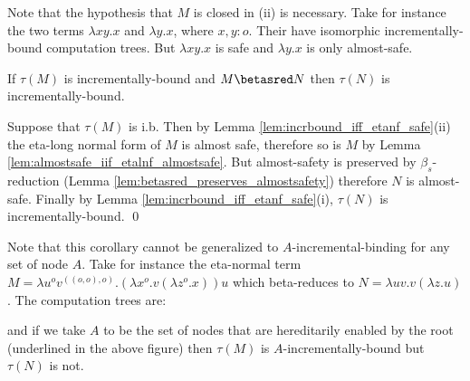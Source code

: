 Note that the hypothesis that $M$ is closed in (ii) is necessary.
Take for instance the two terms $\lambda x y .x$ and $\lambda y . x$,
where $x,y:o$. Their have isomorphic incrementally-bound computation
trees. But $\lambda x y .x$ is safe and $\lambda y . x$ is
only almost-safe.


\begin{corollary}
\label{cor:betasred_preserve_incrbound} If $\tau(M)$ is incrementally-bound and $M \betasred N$ then $\tau(N)$ is incrementally-bound.
\end{corollary}
\proof Suppose that $\tau(M)$ is i.b. Then by Lemma
\ref{lem:incrbound_iff_etanf_safe}(ii) the eta-long normal form of $M$ is almost safe, therefore so is $M$ by Lemma \ref{lem:almostsafe_iif_etalnf_almostsafe}.
But almost-safety is preserved by $\beta_s$-reduction (Lemma \ref{lem:betasred_preserves_almostsafety}) therefore $N$ is almost-safe. Finally by Lemma \ref{lem:incrbound_iff_etanf_safe}(i), $\tau(N)$ is
incrementally-bound. \qed 
\smallskip

Note that this corollary  cannot be generalized to
$A$-incremental-binding for any set of node $A$. Take for instance
the eta-normal term $M = \lambda u^{o} v^{((o,o),o)} . (\lambda x^o
. v (\lambda z^o . x)) u$ which beta-reduces to $N = \lambda u v . v
(\lambda z . u)$. The computation trees are:
\begin{center}
\end{center}
and if we take $A$ to be the set of nodes that are hereditarily enabled by
the root (underlined in the above figure) then $\tau(M)$
is $A$-incrementally-bound but $\tau(N)$ is not.


